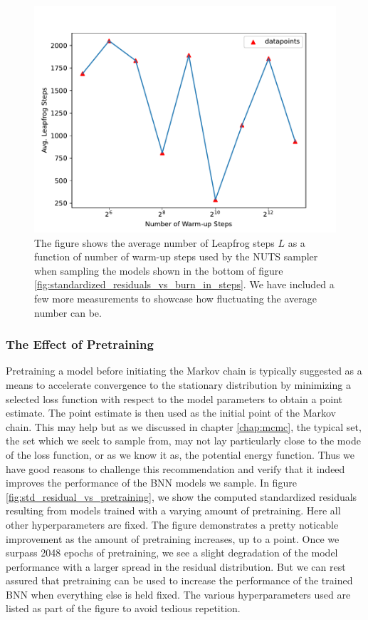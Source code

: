 \begin{figure}
    \centering
    \includegraphics[scale=0.8]{figures/standardized_residuals/effect_of_burnin/avg_burnin_steps_nuts_vs_burn_in_steps.pdf}
    \caption{The figure shows the average number of Leapfrog steps $L$ as a function of number of warm-up steps used by the NUTS sampler when sampling the models shown in the bottom of figure \ref{fig:standardized_residuals_vs_burn_in_steps}. We have included a few more measurements to showcase how fluctuating the average number can be. 
    }
    \label{fig:avg_leapfrog_steps_vs_burn_in}
\end{figure}




\subsubsection{The Effect of Pretraining}
Pretraining a model before initiating the Markov chain is typically suggested as a means to accelerate convergence to the stationary distribution by minimizing a selected loss function with respect to the model parameters to obtain a point estimate. The point estimate is then used as the initial point of the Markov chain. This may help but as we discussed in chapter \ref{chap:mcmc}, the typical set, the set which we seek to sample from, may not lay particularly close to the mode of the loss function, or as we know it as, the potential energy function. Thus we have good reasons to challenge this recommendation and verify that it indeed improves the performance of the BNN models we sample. In figure \ref{fig:std_residual_vs_pretraining}, we
show the computed standardized residuals resulting from models trained with a varying amount of pretraining. Here all other
hyperparameters are fixed. The figure demonstrates a pretty noticable improvement as the amount of pretraining increases, up to a point. Once we surpass 2048 epochs of pretraining, we see a slight degradation of the model performance with a larger spread in the residual distribution. But we can rest assured that pretraining can be used to increase the performance of the trained BNN when everything else is held fixed. The various hyperparameters used are listed as part of the figure to avoid tedious repetition.


